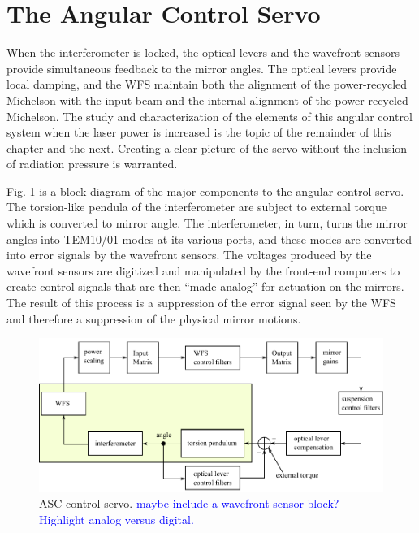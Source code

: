 \section{The Angular Control Servo}
When the interferometer is locked, the optical levers and the wavefront sensors provide simultaneous feedback to the mirror angles. The optical levers provide local damping, and the WFS maintain both the alignment of the power-recycled Michelson with the input beam and the internal alignment of the power-recycled Michelson. The study and characterization of the elements of this angular control system when the laser power is increased is the topic of the remainder of this chapter and the next. Creating a clear picture of the servo without the inclusion of radiation pressure is warranted.

Fig. \ref{fig:ASCcontrolservo} is a block diagram of the major components to the angular control servo. The torsion-like pendula of the interferometer are subject to external torque which is converted to mirror angle. The interferometer, in turn, turns the mirror angles into TEM10/01 modes at its various ports, and these modes are converted into error signals by the wavefront sensors. The voltages produced by the wavefront sensors are digitized and manipulated by the front-end computers to create control signals that are then ``made analog'' for actuation on the mirrors. The result of this process is a suppression of the error signal seen by the WFS and therefore a suppression of the physical mirror motions. 

\begin{figure} 
\begin{centering} 
\includegraphics{figures/ASCcontrolservo.pdf} 
\caption[ASC control servo]{ASC control servo. \textcolor{blue}{maybe include a wavefront sensor block? Highlight analog versus digital.}}
\label{fig:ASCcontrolservo}
\end{centering}
\end{figure}

